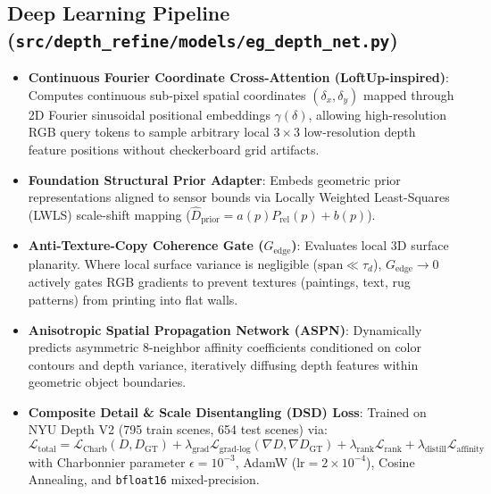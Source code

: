 \documentclass[10pt,a4paper]{article}
\begin{document}
\subsection{Deep Learning Pipeline (\texttt{src/depth\_refine/models/eg\_depth\_net.py})}
\begin{itemize}[leftmargin=*]
    \item \textbf{Continuous Fourier Coordinate Cross-Attention (LoftUp-inspired)}: Computes continuous sub-pixel spatial coordinates $(\delta_x, \delta_y)$ mapped through 2D Fourier sinusoidal positional embeddings $\gamma(\delta)$, allowing high-resolution RGB query tokens to sample arbitrary local $3\times 3$ low-resolution depth feature positions without checkerboard grid artifacts.
    \item \textbf{Foundation Structural Prior Adapter}: Embeds geometric prior representations aligned to sensor bounds via Locally Weighted Least-Squares (LWLS) scale-shift mapping ($\hat{D}_{\text{prior}} = a(p) P_{\text{rel}}(p) + b(p)$).
    \item \textbf{Anti-Texture-Copy Coherence Gate ($G_{\text{edge}}$)}: Evaluates local 3D surface planarity. Where local surface variance is negligible ($\text{span} \ll \tau_d$), $G_{\text{edge}} \to 0$ actively gates RGB gradients to prevent textures (paintings, text, rug patterns) from printing into flat walls.
    \item \textbf{Anisotropic Spatial Propagation Network (ASPN)}: Dynamically predicts asymmetric 8-neighbor affinity coefficients conditioned on color contours and depth variance, iteratively diffusing depth features within geometric object boundaries.
    \item \textbf{Composite Detail \& Scale Disentangling (DSD) Loss}: Trained on NYU Depth V2 (795 train scenes, 654 test scenes) via:
    \begin{equation}
        \mathcal{L}_{\text{total}} = \mathcal{L}_{\text{Charb}}(D, D_{\text{GT}}) + \lambda_{\text{grad}} \mathcal{L}_{\text{grad-log}}(\nabla D, \nabla D_{\text{GT}}) + \lambda_{\text{rank}} \mathcal{L}_{\text{rank}} + \lambda_{\text{distill}} \mathcal{L}_{\text{affinity}}
    \end{equation}
    with Charbonnier parameter $\epsilon=10^{-3}$, AdamW ($\text{lr} = 2 \times 10^{-4}$), Cosine Annealing, and \texttt{bfloat16} mixed-precision.
\end{itemize}
\end{document}
